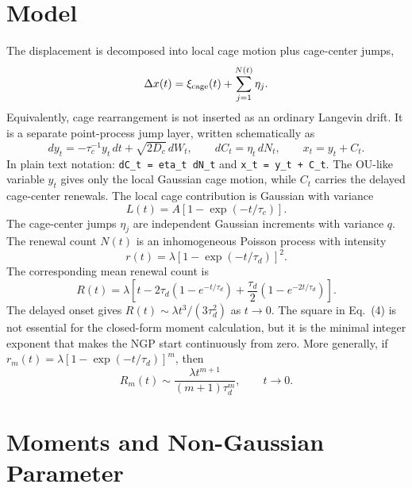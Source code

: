 \documentclass[aps,preprint,onecolumn,superscriptaddress,nofootinbib]{revtex4-2}
\begin{document}
\section{Model}

The displacement is decomposed into local cage motion plus cage-center jumps,
\begin{equation}
  \Delta x(t) = \xi_{\rm cage}(t) + \sum_{j=1}^{N(t)} \eta_j.
\end{equation}
Equivalently, cage rearrangement is not inserted as an ordinary Langevin drift.
It is a separate point-process jump layer, written schematically as
\begin{equation}
  dy_t = -\tau_c^{-1}y_t\,dt + \sqrt{2D_c}\,dW_t,\qquad
  dC_t = \eta_t\,dN_t,\qquad
  x_t = y_t + C_t.
\end{equation}
In plain text notation: \verb|dC_t = eta_t dN_t| and \verb|x_t = y_t + C_t|. The OU-like
variable $y_t$ gives only the local Gaussian cage motion, while $C_t$ carries
the delayed cage-center renewals.
The local cage contribution is Gaussian with variance
\begin{equation}
  L(t)=A\left[1-\exp(-t/\tau_c)\right].
\end{equation}
The cage-center jumps $\eta_j$ are independent Gaussian increments with
variance $q$. The renewal count $N(t)$ is an inhomogeneous Poisson process with
intensity
\begin{equation}
  r(t)=\lambda\left[1-\exp(-t/\tau_d)\right]^2.
\end{equation}
The corresponding mean renewal count is
\begin{equation}
  R(t)=\lambda\left[
    t-2\tau_d(1-e^{-t/\tau_d})
    +\frac{\tau_d}{2}(1-e^{-2t/\tau_d})
  \right].
\end{equation}
The delayed onset gives $R(t)\sim \lambda t^3/(3\tau_d^2)$ as $t\to0$.
The square in Eq.~(4) is not essential for the closed-form moment
calculation, but it is the minimal integer exponent that makes the NGP start
continuously from zero. More generally, if
$r_m(t)=\lambda[1-\exp(-t/\tau_d)]^m$, then
\begin{equation}
  R_m(t)\sim \frac{\lambda t^{m+1}}{(m+1)\tau_d^m},\qquad t\to0.
\end{equation}

\section{Moments and Non-Gaussian Parameter}
\end{document}
